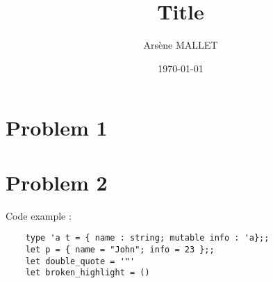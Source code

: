 \documentclass{article}
\title{Title}
\date{\today}
\author{Arsène MALLET}
\begin{document}
\thispagestyle{firstpage}

\begin{center}
    \huge\bfseries{\@title}
\end{center}

\section{Problem 1}

\lipsum[1-2]

\section{Problem 2}

Code example : 
\begin{verbatim}
    type 'a t = { name : string; mutable info : 'a};;
    let p = { name = "John"; info = 23 };;
    let double_quote = '"'
    let broken_highlight = ()
\end{verbatim}
\end{document}
